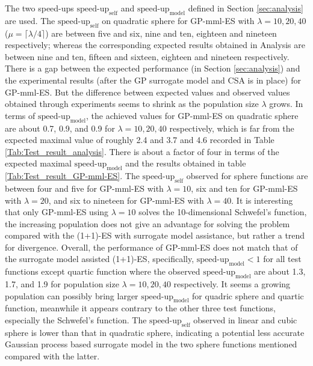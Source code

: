 The two speed-ups $\text{speed-up}_{\text{self}}$ and $\text{speed-up}_{\text{model}}$ defined in Section \ref{sec:analysis} are used.  The $\text{speed-up}_{\text{self}}$ on quadratic sphere for GP-mml-ES with $\lambda=10,20,40$($\mu = \lceil \lambda/4 \rceil $) are between five and six, nine and ten, eighteen and nineteen respectively; whereas the corresponding expected results obtained in Analysis are between nine and ten, fifteen and sixteen, eighteen and nineteen respectively. There is a gap between the expected performance (in Section \ref{sec:analysis}) and the experimental results (after the GP surrogate model and CSA is in place) for GP-mml-ES. But the difference between expected values and observed values obtained through experiments seems to shrink as the population size $\lambda$ grows. In terms of $\text{speed-up}_{\text{model}}$, the achieved values for GP-mml-ES on quadratic sphere are about 0.7, 0.9, and 0.9 for $\lambda=10,20,40$ respectively, which is far from the expected maximal value of roughly 2.4 and 3.7 and 4.6 recorded in Table \ref{Tab:Test_result_analysis}. There is about a factor of four in terms of the expected maximal $\text{speed-up}_{\text{model}}$ and the results obtained in table \ref{Tab:Test_result_GP-mml-ES}. The $\text{speed-up}_{\text{self}}$ observed for sphere functions are between four and five for GP-mml-ES with $\lambda=10$, six and ten for GP-mml-ES with $\lambda=20$, and six to nineteen for GP-mml-ES with $\lambda=40$. It is interesting that only GP-mml-ES using $\lambda=10$ solves the 10-dimensional Schwefel's function, the increasing population does not give an advantage for solving the problem compared with the (1+1)-ES with surrogate model assistance, but rather a trend for divergence. Overall, the performance of GP-mml-ES does not match that of the surrogate model assisted (1+1)-ES, specifically, $\text{speed-up}_{\text{model}}<1$ for all test functions except quartic function where the observed $\text{speed-up}_{\text{model}}$ are about 1.3, 1.7, and 1.9 for population size $\lambda=10,20,40$ respectively. It seems a growing population can possibly bring larger $\text{speed-up}_{\text{model}}$ for quadric sphere and quartic function, meanwhile it appears contrary to the other three test functions, especially the Schwefel's function. The $\text{speed-up}_{\text{self}}$ observed in linear and cubic sphere is lower than that in quadratic sphere, indicating a potential less accurate Gaussian process based surrogate model in the two sphere functions mentioned compared with the latter. 


